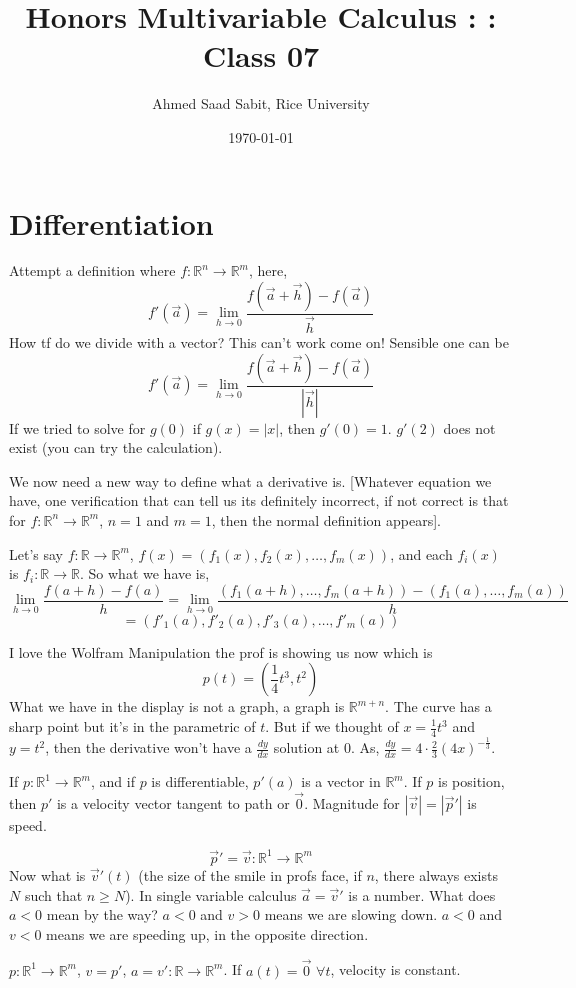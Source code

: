 \documentclass[letter]{article}
\title{Honors Multivariable Calculus : : Class 07}
\author{Ahmed Saad Sabit, Rice University}
\date{\today}
\begin{document}
\maketitle

\section{Differentiation}

	Attempt a definition where $f: \mathbb{R}^{n} \to \mathbb{R}^{m}$, here, 
	\[
	f'(\vec{a}) = \lim_{h \to 0} \frac{f(\vec{a}+\vec{h})-f(\vec{a})}{\vec{h}}
	\] How tf do we divide with a vector? This can't work come on! Sensible one can be
	\[
	f'(\vec{a}) = \lim_{h \to 0} \frac{f(\vec{a}+\vec{h})-f(\vec{a})}{|\vec{h}|}
	\]
	If we tried to solve for $g(0)$ if $g(x) = |x|$, then $g'(0) = 1$. $g'(2)$ does not exist (you can try the calculation).

	We now need a new way to define what a derivative is. [Whatever equation we have, one verification that can tell us its definitely incorrect, if not correct is that for $f:\mathbb{R}^{n} \to \mathbb{R}^{m}$, $n=1$ and $m=1$, then the normal definition appears].

	Let's say $f:\mathbb{R}\to \mathbb{R}^{m}$, $f(x)=( f_1(x),f_2(x), \ldots, f_m(x))$, and each $f_i (x)$ is $f_i : \mathbb{R}\to \mathbb{R}$. So what we have is, 
	\[
	\lim_{h \to 0} \frac{f(a+h) - f(a)}{h} = \lim_{h \to 0} 
	\frac{\left(
f_1(a+h), \ldots, f_m(a+h)
	\right) - 
\left(f_1(a), \ldots, f_m(a)\right)}{h} 
	\] 
	\[
	= \left(
f'_1(a), f'_2(a), f'_3(a),\ldots, f'_m(a)
	\right)
	\]

	I love the Wolfram Manipulation the prof is showing us now which is \[
	p(t) = \left(\frac{1}{4}t^3,t^2\right)
	\] 
	What we have in the display is not a graph, a graph is $\mathbb{R}^{m+n}$. The curve has a sharp point but it's in the parametric of $t$. But if we thought of $x = \frac{1}{4}t^3$ and $y = t^2$, then the derivative won't have a $\frac{dy}{dx}$ solution at $0$. As, $\frac{dy}{dx } = 4\cdot \frac{2}{3} \left(4x\right)^{-\frac{1}{3}}$. 

	If $p: \mathbb{R}^{1} \to \mathbb{R}^{m}$, and if $p$ is differentiable, $p'(a)$ is a vector in $\mathbb{R}^{m}$. If $p$ is position, then $p'$ is a velocity vector tangent to path or $\vec{0}$. Magnitude for $|\vec{v}| = |\vec{p}'|$ is speed. 

	\[
	\vec{p}' = \vec{v} : \mathbb{R}^{1} \to  \mathbb{R}^{m}
	\] 
	Now what is $\vec{v}'(t)$ (the size of the smile in profs face, if $n$, there always exists $N$ such that $n\ge N$). In single variable calculus $\vec{a} = \vec{v}'$ is a number. What does $a<0$ mean by the way? $a<0$ and $v>0$ means we are slowing down. $a<0$ and $v<0$ means we are speeding up, in the opposite direction. 

	$p:\mathbb{R}^{1} \to \mathbb{R}^{m}$, $v = p'$, $a  = v' : \mathbb{R}\to \mathbb{R}^{m}$. If $a(t) = \vec{0}$ $ \forall t$, velocity is constant.  
\end{document}
